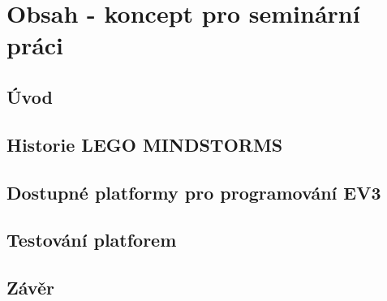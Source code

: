 \chapter{Obsah - koncept pro seminární práci}
\section{Úvod}
\section{Historie LEGO MINDSTORMS}
\section{Dostupné platformy pro programování EV3}
\section{Testování platforem}
\section{Závěr}